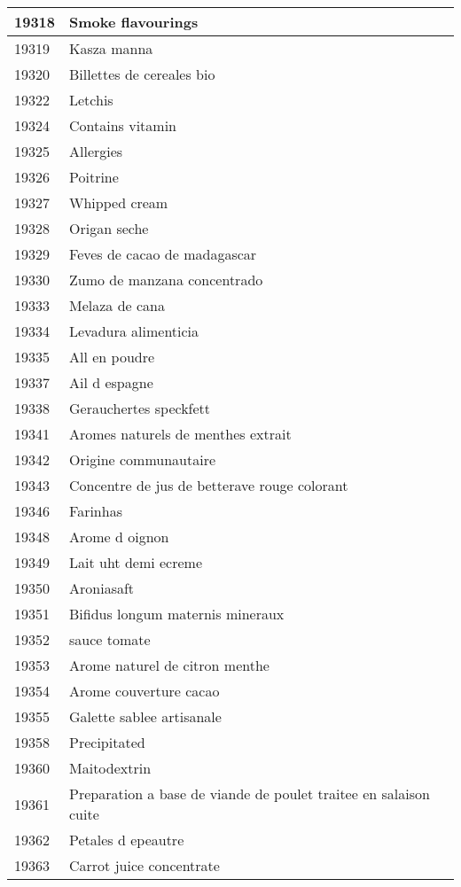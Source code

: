\begin{longtable}{|l|l|}
19318 & Smoke flavourings \\ \hline 
19319 & Kasza manna \\ \hline 
19320 & Billettes de cereales bio \\ \hline 
19322 & Letchis \\ \hline 
19324 & Contains vitamin \\ \hline 
19325 & Allergies \\ \hline 
19326 & Poitrine \\ \hline 
19327 & Whipped cream \\ \hline 
19328 & Origan seche \\ \hline 
19329 & Feves de cacao de madagascar \\ \hline 
19330 & Zumo de manzana concentrado \\ \hline 
19333 & Melaza de cana \\ \hline 
19334 & Levadura alimenticia \\ \hline 
19335 & All en poudre \\ \hline 
19337 & Ail d espagne \\ \hline 
19338 & Gerauchertes speckfett \\ \hline 
19341 & Aromes naturels de menthes extrait \\ \hline 
19342 & Origine communautaire \\ \hline 
19343 & Concentre de jus de betterave rouge colorant \\ \hline 
19346 & Farinhas \\ \hline 
19348 & Arome d oignon \\ \hline 
19349 & Lait uht demi ecreme \\ \hline 
19350 & Aroniasaft \\ \hline 
19351 & Bifidus longum maternis mineraux \\ \hline 
19352 & sauce tomate \\ \hline 
19353 & Arome naturel de citron menthe \\ \hline 
19354 & Arome couverture cacao \\ \hline 
19355 & Galette sablee artisanale \\ \hline 
19358 & Precipitated \\ \hline 
19360 & Maitodextrin \\ \hline 
19361 & Preparation a base de viande de poulet traitee en salaison cuite \\ \hline 
19362 & Petales d epeautre \\ \hline 
19363 & Carrot juice concentrate \\ \hline 

\end{longtable}

